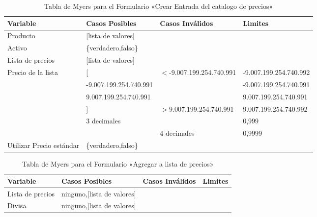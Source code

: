 \begin{table}[H]
\centering
\begin{tabular}{|p{3.0cm}|p{4.0cm}|p{4.0cm}|l|}
\hline
\footnotesize{\textbf{Variable}} & \footnotesize{\textbf{Casos Posibles}} & \footnotesize{\textbf{Casos Inválidos}} & \footnotesize{\textbf{Limites}} \\
\hline
\footnotesize{Producto} & \footnotesize{[lista de valores]} & & \\
\hline
\footnotesize{Activo}  & \footnotesize{\{verdadero,falso\}} & & \\
\hline
\footnotesize{Lista de precios} & \footnotesize{[lista de valores]} & & \\
\hline
\footnotesize{Precio de la lista} & \footnotesize{[} & \footnotesize{$<$-9.007.199.254.740.991} & \footnotesize{-9.007.199.254.740.992} \\
& \footnotesize{-9.007.199.254.740.991} & & \footnotesize{-9.007.199.254.740.991} \\
& \footnotesize{9.007.199.254.740.991} & & \footnotesize{9.007.199.254.740.991} \\
& \footnotesize{]} & \footnotesize{$>$9.007.199.254.740.991} & \footnotesize{9.007.199.254.740.992} \\
& \footnotesize{3 decimales} & & \footnotesize{0,999} \\
& & \footnotesize{4 decimales} & \footnotesize{0,9999} \\
\hline
\footnotesize{Utilizar Precio estándar} & \footnotesize{\{verdadero,falso\}} & & \\
\hline
\end{tabular}
\caption{Tabla de Myers para el Formulario «Crear Entrada del catalogo de precios»}
\label{myers_02}
\end{table}

\begin{table}[H]
\centering
\begin{tabular}{|p{6.0cm}|l|l|l|}
\hline
\footnotesize{\textbf{Variable}} & \footnotesize{\textbf{Casos Posibles}} & \footnotesize{\textbf{Casos Inválidos}} & \footnotesize{\textbf{Limites}} \\
\hline
\footnotesize{Lista de precios} & \footnotesize{ninguno,[lista de valores]} & & \\
\hline
\footnotesize{Divisa} & \footnotesize{ninguno,[lista de valores]} & & \\
\hline
\end{tabular}
\caption{Tabla de Myers para el Formulario «Agregar a lista de precios»}
\label{myers_03}
\end{table}


